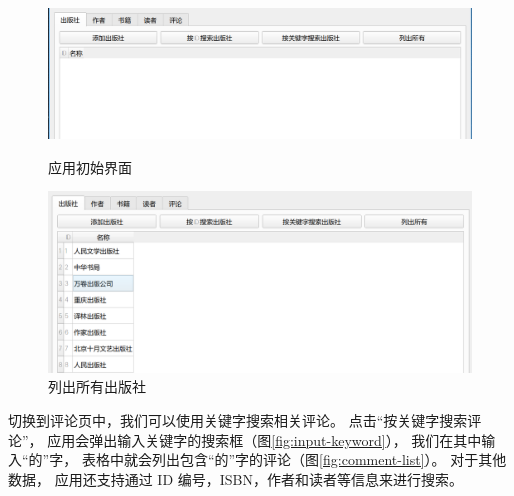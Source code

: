 \documentclass[12pt,onecolumn]{report}
\theoremstyle{plain}
\numberwithin{figure}{chapter}
\numberwithin{table}{chapter}
\numberwithin{lstlisting}{chapter}
\begin{document}
\begin{figure}[ht]
  \centering
  \begin{minipage}{0.45\linewidth}
    \centering
    \includegraphics[width=\linewidth]{figures/init.png}
    \caption{应用初始界面}\label{fig:init}
  \end{minipage}
  \begin{minipage}{0.45\linewidth}
    \centering
    \includegraphics[width=\linewidth]{figures/publisher-list.png}
    \caption{列出所有出版社}\label{fig:publisher-list}
  \end{minipage}
\end{figure}

切换到评论页中，我们可以使用关键字搜索相关评论。
点击``按关键字搜索评论''，
应用会弹出输入关键字的搜索框（图\ref{fig:input-keyword}），
我们在其中输入``的''字，
表格中就会列出包含``的''字的评论（图\ref{fig:comment-list}）。
对于其他数据，
应用还支持通过 ID 编号，ISBN，作者和读者等信息来进行搜索。
\end{document}
